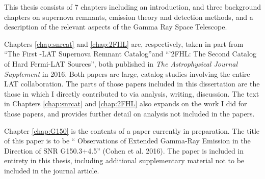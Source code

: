 This thesis consists of 7 chapters including an introduction, and three background chapters on supernova remnants, \gam{} emission theory and detection methods, and a description of the relevant aspects of the \Fermi{} Gamma Ray Space Telescope.

Chapters \ref{chap:snrcat} and  \ref{chap:2FHL} are, respectively, taken in part from ``The First \Fermi{}-LAT Supernova Remnant Catalog''and ``'2FHL: The Second Catalog of Hard Fermi-LAT Sources'', both published in \emph{The Astrophysical Journal Supplement} in 2016. Both papers are large, catalog studies involving the entire LAT collaboration. The parts of those papers included in this dissertation are the those in which I directly contributed to via analysis, writing, discussion. The text in Chapters \ref{chap:snrcat} and \ref{chap:2FHL} also expands on the work I did for those papers, and provides further detail on analysis not included in the papers.

Chapter \ref{chap:G150} is the contents of a paper currently in preparation. The title of this paper is to be ``\FermiLat{} Observations of Extended Gamma-Ray Emission in the Direction of SNR G150.3+4.5'' (Cohen et al. 2016). The paper is included in entirety in this thesis, including additional supplementary material not to be included in the journal article. 


